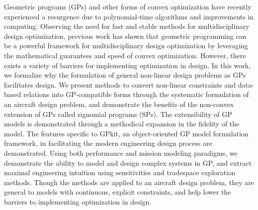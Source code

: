 % 
% 
%


Geometric programs (GPs) and other forms of convex optimization have recently experienced
a resurgence due to polynomial-time algorithms and improvements in computing.
Observing the need for fast and stable methods for multidisciplinary
design optimization,
previous work has shown that geometric programming can be a powerful framework
for multidisciplinary design optimization by leveraging the mathematical guarantees
and speed of convex optimization. However, there exists a variety of barriers for
implementing optimization in design. In this work, we formalize why the formulation
of general non-linear design problems as GPs facilitates design. We present methods
to convert non-linear constraints and data-based relations into GP-compatible forms
through the systematic formulation of an aircraft design problem,
and demonstrate the benefits of the non-convex extension of GPs called signomial programs (SPs).
The extensibility of GP models is demonstrated through a methodical expansion
in the fidelity of the model.
The features specific to GPkit, an object-oriented GP model formulation framework, in
facilitating the modern engineering design process are demonstrated.
Using both performance and mission modeling paradigms, we demonstrate the ability to
model and design complex systems in GP, and extract maximal engineering intuition
using sensitivities and tradespace exploration methods.
Though the methods are applied to an aircraft design problem, they are general to
models with continuous, explicit constraints, and help lower the barriers to implementing
optimization in design.

